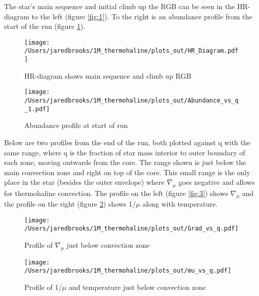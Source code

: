 \documentclass{article}
\begin{document}
        The star's main sequence and initial climb up the RGB can be seen in the HR-diagram to the left (figure \ref{fig:1}).  To the right is an abundance profile from the start of the run (figure \ref{fig:2}).

        \begin{figure}[H]
          \begin{minipage}[b]{0.5\linewidth}
	    \centering
	    \texttt{[image: /Users/jaredbrooks/1M\_thermohaline/plots\_out/HR\_Diagram.pdf]}
	    \caption{HR-diagram shows main sequence and climb up RGB}
	    \label{fig:1}
          \end{minipage}
          \hspace{0cm}
          \begin{minipage}[b]{0.5\linewidth}
            \centering
            \texttt{[image: /Users/jaredbrooks/1M\_thermohaline/plots\_out/Abundance\_vs\_q\_1.pdf]}
            \caption{Abundance profile at start of run}
            \label{fig:2}
          \end{minipage}
	\end{figure}

        \pagebreak

        Below are two profiles from the end of the run, both plotted against q with the same range, where q is the fraction of star mass interior to outer boundary of each zone, moving outwards from the core.  The range shown is just below the main convection zone and right on top of the core.  This small range is the only place in the star (besides the outer envelope) where $\nabla{_\mu}$ goes negative and allows for thermohaline convection.  The profile on the left (figure \ref{fig:3}) shows $\nabla{_\mu}$ and the profile on the right (figure \ref{fig:4}) shows 1/$\mu$ along with temperature.

        \begin{figure}[H]
          \begin{minipage}[b]{0.5\linewidth}
            \centering
            \texttt{[image: /Users/jaredbrooks/1M\_thermohaline/plots\_out/Grad\_vs\_q.pdf]}
            \caption{Profile of $\nabla{_\mu}$ just below convection zone}
            \label{fig:3}
          \end{minipage}
          \hspace{0cm}
          \begin{minipage}[b]{0.5\linewidth}
            \centering
            \texttt{[image: /Users/jaredbrooks/1M\_thermohaline/plots\_out/mu\_vs\_q.pdf]}
            \caption{Profile of 1/$\mu$ and temperature just below convection zone}
            \label{fig:4}
          \end{minipage}
        \end{figure}
\end{document}
